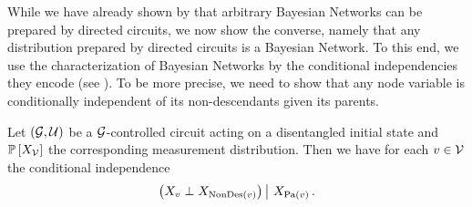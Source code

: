 While we have already shown by  that arbitrary Bayesian Networks can be prepared by directed circuits, we now show the converse, namely that any distribution prepared by directed circuits is a Bayesian Network.
To this end, we use the characterization of Bayesian Networks by the conditional independencies they encode (see \cite{koller_probabilistic_2009}).
To be more precise, we need to show that any node variable is conditionally independent of its non-descendants given its parents.

\begin{lemma}
    \label{lem:GCCtoBN}
    Let $(\mathcal{G},\mathcal{U})$ be a $\mathcal{G}$-controlled circuit acting on a disentangled initial state and $\mathbb{P}\left[X_{\mathcal{V}}\right]$ the corresponding measurement distribution.
    Then we have for each $v\in\mathcal{V}$ the conditional independence
    \begin{align*}
        \left(X_{v}\perp X_{\mathrm{NonDes}(v)}\middle)\,\right|\,X_{\mathrm{Pa}(v)} \, .
    \end{align*}
\end{lemma}
